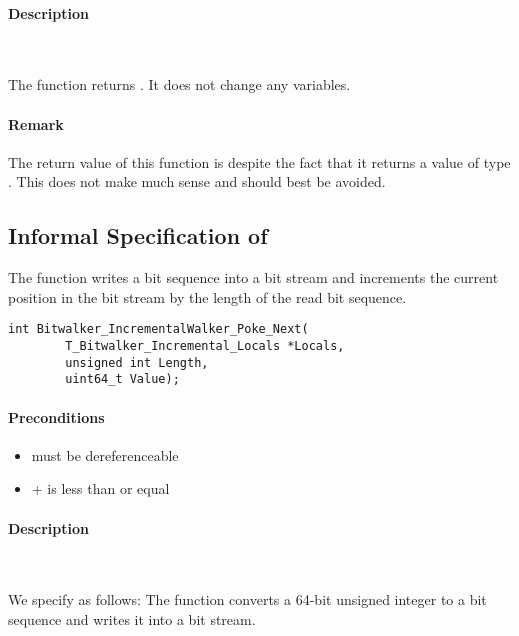 \paragraph{Description}~

The function  returns .
It does not change any variables.

\paragraph*{Remark} The return value of this function is  despite
the fact that it returns a value of type .
This does not make much sense and should best be avoided.

\clearpage

\subsection{Informal Specification of }

The function \pokenext writes a bit sequence into a bit stream 
and increments the current position in the bit stream by the 
length of the read bit sequence.\\[1em]


\begin{lstlisting}[style=acsl-block]
int Bitwalker_IncrementalWalker_Poke_Next(
        T_Bitwalker_Incremental_Locals *Locals,
        unsigned int Length,
        uint64_t Value);
\end{lstlisting}


\paragraph{Preconditions}
\begin{itemize}
    \item  {} must be dereferenceable
    \item {} +  is less than or equal 
\end{itemize}

\paragraph{Description}~

We specify \pokenext as follows:
The function \poke converts a 64-bit unsigned integer to a bit sequence and 
writes it into a bit stream.

